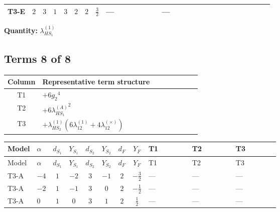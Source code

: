\documentclass[8pt]{article}
\begin{document}
\begin{landscape}
\begin{longtable}{@{}llcccccc >{\raggedright\arraybackslash}p{0.21\linewidth} >{\raggedright\arraybackslash}p{0.21\linewidth} >{\raggedright\arraybackslash}p{0.21\linewidth}@{}}
\midrule
T3-E & $2$ & $3$ & $1$ & $3$ & $2$ & $2$ & $\frac{3}{2}$ & --- & --- & \scriptsize\adjustbox{max width=\linewidth}{$\begin{gathered} {\lambda_{HS_1}^{(1)}} (2 T_{\nu}^{(1)}+6 \operatorname{Tr}\!\left({Y_d}\,\left({Y_d}\right)^{\dagger}\right)+2 \operatorname{Tr}\!\left({Y_e}\,\left({Y_e}\right)^{\dagger}\right)+6 \operatorname{Tr}\!\left({Y_u}\,\left({Y_u}\right)^{\dagger}\right)+4 {\lambda_{S_1}^{(A)}})\end{gathered}$} \\
\midrule
\bottomrule
\end{longtable}
\clearpage
\noindent\textbf{Quantity: }$\lambda_{HS_1}^{(1)}$\par\smallskip
\subsection*{Terms 8 of 8}
\begin{center}
\begin{tabular}{@{}c >{\raggedright\arraybackslash}p{0.82\linewidth}@{}}
\toprule
Column & Representative term structure \\
\midrule
T1 & \(\displaystyle +6 {g_2}^4\) \\
\midrule
T2 & \(\displaystyle +6 {\lambda_{HS_1}^{(A)}}^2\) \\
\midrule
T3 & \(\displaystyle +{\lambda_{HS_2}^{(1)}} (6 {\lambda_{12}^{(1)}}+4 {\lambda_{12}^{(\times)}})\) \\
\midrule
\bottomrule
\end{tabular}
\end{center}
\smallskip
\tiny
\begin{longtable}{@{}llcccccc >{\raggedright\arraybackslash}p{0.21\linewidth} >{\raggedright\arraybackslash}p{0.21\linewidth} >{\raggedright\arraybackslash}p{0.21\linewidth}@{}}
\toprule
Model & $\alpha$ & $d_{S_1}$ & $Y_{S_1}$ & $d_{S_2}$ & $Y_{S_2}$ & $d_F$ & $Y_F$ & T1 & T2 & T3 \\
\midrule
\endfirsthead
\toprule
Model & $\alpha$ & $d_{S_1}$ & $Y_{S_1}$ & $d_{S_2}$ & $Y_{S_2}$ & $d_F$ & $Y_F$ & T1 & T2 & T3 \\
\midrule
\endhead
T3-A & $-4$ & $1$ & $-2$ & $3$ & $-1$ & $2$ & $-\frac{3}{2}$ & --- & --- & --- \\
\midrule
T3-A & $-2$ & $1$ & $-1$ & $3$ & $0$ & $2$ & $-\frac{1}{2}$ & --- & --- & --- \\
\midrule
T3-A & $0$ & $1$ & $0$ & $3$ & $1$ & $2$ & $\frac{1}{2}$ & --- & --- & --- \\

\end{longtable}
\end{landscape}
\end{document}
